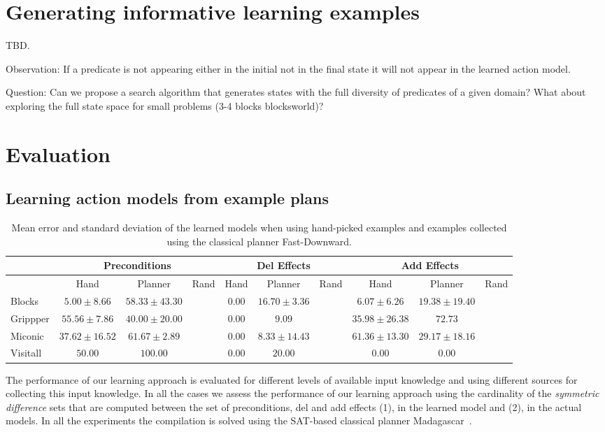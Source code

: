 \documentclass[letterpaper]{article} %
\begin{document}
\section{Generating informative learning examples}
TBD.

Observation: If a predicate is not appearing either in the initial not in the final state it will not appear in the learned action model.

Question: Can we propose a search algorithm that generates states with the full diversity of predicates of a given domain? What about exploring the full state space for small problems (3-4 blocks blocksworld)?


\section{Evaluation}

\subsection{Learning action models from example plans}
\begin{table*}[!hbt]
\begin{footnotesize}
\begin{tabular}{l||c|c|c||c|c|c||c|c|c}
 & \multicolumn{3}{c||}{Preconditions} & \multicolumn{3}{c||}{Del Effects} & \multicolumn{3}{c}{Add Effects} \\\hline
 & Hand & Planner & Rand & Hand & Planner & Rand & Hand & Planner & Rand \\\hline
Blocks & $5.00\pm 8.66$ & $58.33\pm 43.30$ & & $0.00$ & $16.70\pm 3.36$ & & $6.07\pm 6.26$ & $19.38\pm 19.40$&\\
Grippper & $55.56\pm 7.86$ & $40.00\pm 20.00$ & & $0.00$ & $9.09$ & & $35.98\pm 26.38$ & $72.73$&\\
Miconic & $37.62\pm 16.52$ & $61.67\pm 2.89$ & & $0.00$ & $8.33\pm 14.43$ & & $61.36\pm 13.30$ & $29.17\pm 18.16$&\\
Visitall & $50.00$ & $100.00$ & & $0.00$ & $20.00$ & & $0.00$ & $0.00$&
\end{tabular}
\end{footnotesize}
\caption{\small Mean error and standard deviation of the learned models when using hand-picked examples and examples collected using the classical planner Fast-Downward.}
  \label{tab:eplans}
\end{table*}

The performance of our learning approach is evaluated for different levels of available input knowledge and using different sources for collecting this input knowledge. In all the cases we assess the performance of our learning approach using the cardinality of the {\em symmetric difference} sets that are computed between the set of preconditions, del and add effects (1), in the learned model and (2), in the actual models. In all the experiments the compilation is solved using the SAT-based classical planner {\sc Madagascar}~\cite{rintanen2014madagascar}.
\end{document}

